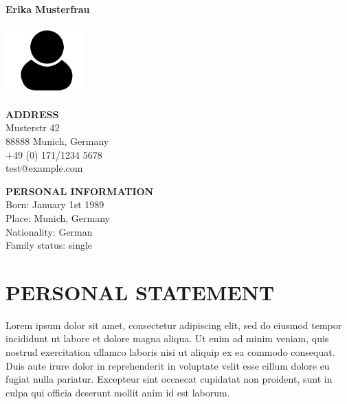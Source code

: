 \documentclass[twoside]{article}
\newcommand{\horizontalline}{
 \vspace{-6 mm}
\makebox[\linewidth]{\rule{0.8\paperwidth}{0.6pt}}
\newline
}
\begin{document}
\vspace{-3 mm}
\noindent
	\begin{minipage}[t][][t]{0.37\textwidth} %
\centerline{\huge \bf Erika Musterfrau }
	\end{minipage}
	\hfill
	\begin{minipage}[t]{0.4\textwidth}
	\hfill \includegraphics[width=3cm]{userImage}
\end{minipage}
\newline
\makebox[\linewidth]{\rule{0.9\paperwidth}{1pt}}
\newline

\noindent
\begin{minipage}{0.5\textwidth}
\textbf{ADDRESS}\\ 
Musterstr 42\\
88888 Munich, Germany\\
+49 (0) 171/1234 5678\\
test@example.com 
\end{minipage} \hfill
\begin{minipage}{0.5\textwidth}
\flushright
\textbf{PERSONAL INFORMATION} \\ 
Born: January 1st 1989\\
Place:  Munich, Germany \\
Nationality: German \\
Family status: single\\
\end{minipage}

\section*{PERSONAL STATEMENT} 
\horizontalline
\newline
Lorem ipsum dolor sit amet, consectetur adipiscing elit, sed do eiusmod tempor incididunt ut labore et dolore magna aliqua. Ut enim ad minim veniam, quis nostrud exercitation ullamco laboris nisi ut aliquip ex ea commodo consequat. Duis aute irure dolor in reprehenderit in voluptate velit esse cillum dolore eu fugiat nulla pariatur. Excepteur sint occaecat cupidatat non proident, sunt in culpa qui officia deserunt mollit anim id est laborum.
\end{document}
